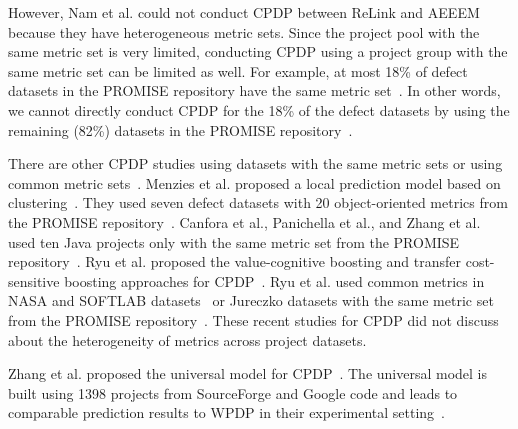 However, Nam et al. could not conduct CPDP between ReLink and AEEEM because they
have heterogeneous metric sets.
Since the project pool with the same metric set is very limited, conducting
CPDP using a project group with the same metric set can be
limited as well. For example, at most 18\% of defect datasets in the
PROMISE repository have the same metric set~\cite{promise12}. In other words,
we cannot directly conduct CPDP for the 18\% of the defect datasets by
using the remaining (82\%) datasets in the PROMISE
repository~\cite{promise12}.


There are other CPDP studies using datasets with the same metric sets or using common metric sets~\cite{Canfora13,me12d,promise12,Panichella14,Zhang15,Ryu14,Ryu15}.
Menzies et al. proposed a local prediction model based on clustering~\cite{me12d}. They used seven defect datasets with 20 object-oriented metrics from the PROMISE repository~\cite{me12d,promise12}.
Canfora et al., Panichella et al., and Zhang et al.
used ten Java projects only with the same metric set from the PROMISE
repository~\cite{Canfora13,promise12,Panichella14,Zhang15}.
Ryu et al. proposed the value-cognitive boosting and transfer cost-sensitive boosting approaches for CPDP~\cite{Ryu14,Ryu15}. Ryu et al. used common metrics in NASA and SOFTLAB datasets~\cite{Ryu14} or Jureczko datasets with the same metric set from the PROMISE repository~\cite{Ryu15}. These recent studies for CPDP did not discuss about the heterogeneity of metrics across project datasets.




Zhang et al. proposed the universal model for CPDP~\cite{Zhang14}.
The universal model is
built using 1398 projects from SourceForge and Google code and leads to
comparable prediction results to WPDP in their experimental
setting~\cite{Zhang14}.

